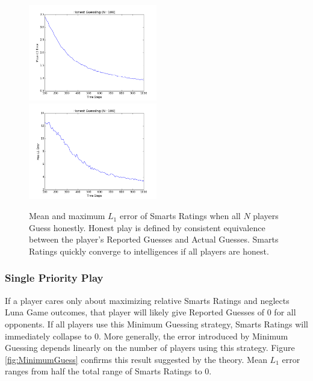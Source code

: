 \begin{figure}[h]
\centerline{%
\includegraphics[width=0.5\textwidth]{figures/robustness/Honest_Guessing21.png}%
\includegraphics[width=0.5\textwidth] {figures/robustness/Honest_Guessing22.png}%
}%
\caption{Mean and maximum $L_1$ error of Smarts Ratings when all $N$ players Guess honestly. Honest play is defined by consistent equivalence between the player's Reported Guesses and Actual Guesses. Smarts Ratings quickly converge to intelligences if all players are honest.}
\label{fig:HonestGuess}
\end{figure}

\subsubsection{Single Priority Play}

If a player cares only about maximizing relative Smarts Ratings and neglects Luna Game outcomes, that player will likely give Reported Guesses of 0 for all opponents. If all players use this Minimum Guessing strategy, Smarts Ratings will immediately collapse to 0. More generally, the error introduced by Minimum Guessing depends linearly on the number of players using this strategy. Figure \ref{fig:MinimumGuess} confirms this result suggested by the theory. Mean $L_1$ error ranges from half the total range of Smarts Ratings to 0.

